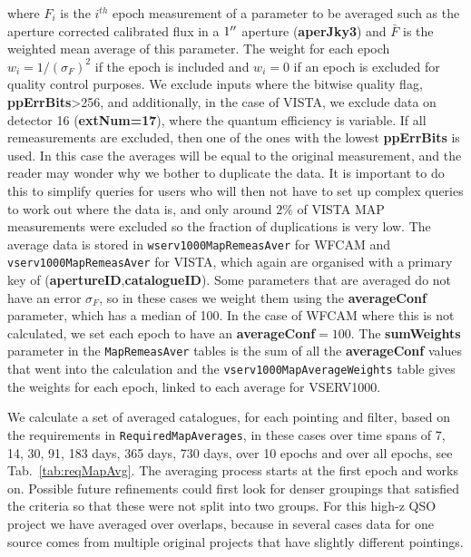 \documentclass[usenatbib]{mnras}
\begin{document}
    \noindent where $F_i$ is the $i^{th}$ epoch measurement of a parameter to be
    averaged such as the aperture corrected calibrated flux in a $1\hbox{$^{\prime\prime}$}$ aperture
    ({\bf aperJky3}) and $\bar{F}$ is the weighted mean average of this parameter.
    The weight for each epoch $w_i=1/(\sigma_{F})^2$ if the epoch is included and 
    $w_i=0$ if an epoch is excluded for quality control purposes. We exclude inputs
    where the bitwise quality flag, {\bf ppErrBits}>256, and additionally, in the
    case of VISTA, we exclude data on detector 16 ({\bf extNum=17}), where the 
    quantum efficiency is variable. If all remeasurements are excluded, then one  of
    the ones with the lowest {\bf ppErrBits} is used. In this case the averages 
    will be equal to the original measurement, and the reader may wonder why we 
    bother to duplicate the data. It is important to do this to simplify queries 
    for users who will then not have to set up complex queries to work out where 
    the data is, and only around $2\%$ of VISTA MAP measurements were excluded  so
    the fraction of duplications is very low. The average data is stored in 
    \verb+wserv1000MapRemeasAver+ for WFCAM and \verb+vserv1000MapRemeasAver+ for 
    VISTA, which again are organised with a primary key of ({\bf apertureID},{\bf catalogueID}).
    Some parameters that are averaged do not have an error $\sigma_{F}$, so in these
    cases we weight them using the {\bf averageConf} parameter, which has a median
    of 100. In the case of WFCAM where this is not calculated, we set each epoch to
    have an {\bf averageConf}$=100$. The {\bf sumWeights} parameter in the
    \verb+MapRemeasAver+ tables is the sum of all the {\bf averageConf} values that
    went into the calculation and the \verb+vserv1000MapAverageWeights+ table gives
    the weights for each epoch, linked to each average for VSERV1000. 
    
    We calculate a set of averaged catalogues, for each pointing and filter, based
    on the requirements in \verb+RequiredMapAverages+, in these cases over time
    spans of 7, 14, 30, 91, 183 days, 365 days, 730 days, over 10 epochs and over all epochs,
    see Tab.~\ref{tab:reqMapAvg}. The
    averaging process starts at the first epoch and works on. Possible future
    refinements could first look for denser groupings that satisfied the criteria so
    that these were not split into two groups. For this high-z QSO project we have averaged over overlaps, 
    because in several cases data for one source comes from multiple original projects that have slightly 
    different pointings. 
    
\end{document}
